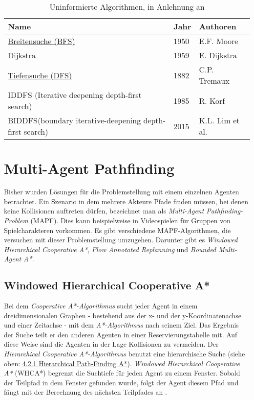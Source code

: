 \begin{table}[h]
	\begin{tabular}[h]{L{8cm}|C{1cm}|L{5cm}}
		\hline
		\textbf{Name}                                                    & \textbf{Jahr} & \textbf{Authoren}        \\ \hline
		\hyperref[sec:bfs]{Breitensuche (BFS)}                                      & 1950 & E.F. Moore      \\ \hline
		\hyperref[sec:dijkstra]{Dijkstra}                                                & 1959 & E. Dijkstra     \\ \hline
		\hyperref[sec:dfs]{Tiefensuche (DFS)}                                       & 1882 & C.P. Tremaux    \\ \hline
		IDDFS (Iterative deepening depth-first search)          & 1985 & R. Korf         \\ \hline
		BIDDFS(boundary iterative-deepening depth-first search) & 2015 & K.L. Lim et al. \\ \hline
	\end{tabular}
	\caption{\label{tab:uninformed}Uninformierte Algorithmen, in Anlehnung an \cite[S.233]{Noo15}}
\end{table}



\section{Multi-Agent Pathfinding}
Bisher wurden Lösungen für die Problemstellung mit einem einzelnen Agenten betrachtet. Ein Szenario in dem mehrere Akteure Pfade finden müssen, bei denen keine Kollisionen auftreten dürfen, bezeichnet man als \textit{Multi-Agent Pathfinding-Problem} (MAPF). Dies kann beispielweise in Videospielen für Gruppen von Spielcharakteren vorkommen. Es gibt verschiedene MAPF-Algorithmen, die versuchen mit dieser Problemstellung umzugehen. Darunter gibt es \textit{Windowed Hierarchical Cooperative A*}, \textit{Flow Annotated Replanning} und \textit{Bounded Multi-Agent A*}.

\subsection{Windowed Hierarchical Cooperative A*}
Bei dem \textit{Cooperative A*-Algorithmus} sucht jeder Agent in einem dreidimensionalen Graphen - bestehend aus der x- und der y-Koordinatenachse und einer Zeitachse - mit dem \textit{A*-Algorithmus} nach seinem Ziel. 
Das Ergebnis der Suche teilt er den anderen Agenten in einer Reservierungstabelle mit. Auf diese Weise sind die Agenten in der Lage Kollisionen zu vermeiden. 
Der \textit{Hierarchical Cooperative A*-Algorithmus} benutzt eine hierarchische Suche (siehe oben: \hyperref[sec:hpa]{4.2.1 Hierarchical Path-Finding A*}). \textit{Windowed Hierarchical Cooperative A*} (WHCA*) begrenzt die Suchtiefe für jeden Agent zu einem Fenster. Sobald der Teilpfad in dem Fenster gefunden wurde, folgt der Agent diesem Pfad und fängt mit der Berechnung des nächsten Teilpfades an \cite[S.2]{Sigurdson.2019}.
